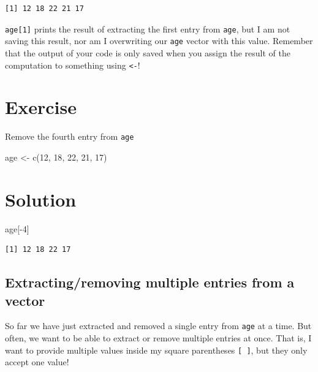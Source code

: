 \documentclass[
  letterpaper,
  DIV=11,
  numbers=noendperiod]{scrreprt}
\newenvironment{Shaded}{\begin{snugshade}}{\end{snugshade}}
\newcommand{\DecValTok}[1]{\textcolor[rgb]{0.68,0.00,0.00}{#1}}
\newcommand{\FunctionTok}[1]{\textcolor[rgb]{0.28,0.35,0.67}{#1}}
\newcommand{\NormalTok}[1]{\textcolor[rgb]{0.00,0.23,0.31}{#1}}
\newcommand{\OtherTok}[1]{\textcolor[rgb]{0.00,0.23,0.31}{#1}}
\newcommand{\SpecialCharTok}[1]{\textcolor[rgb]{0.37,0.37,0.37}{#1}}
\begin{document}
\begin{verbatim}
[1] 12 18 22 21 17
\end{verbatim}

\texttt{age{[}1{]}} prints the result of extracting the first entry from
\texttt{age}, but I am not saving this result, nor am I overwriting our
\texttt{age} vector with this value. Remember that the output of your
code is only saved when you assign the result of the computation to
something using \texttt{\textless{}-}!

\section{Exercise}

Remove the fourth entry from \texttt{age}

\begin{Shaded}
\begin{Highlighting}[]
\NormalTok{age }\OtherTok{\textless{}{-}} \FunctionTok{c}\NormalTok{(}\DecValTok{12}\NormalTok{, }\DecValTok{18}\NormalTok{, }\DecValTok{22}\NormalTok{, }\DecValTok{21}\NormalTok{, }\DecValTok{17}\NormalTok{)}
\end{Highlighting}
\end{Shaded}

\section{Solution}

\begin{Shaded}
\begin{Highlighting}[]
\NormalTok{age[}\SpecialCharTok{{-}}\DecValTok{4}\NormalTok{]}
\end{Highlighting}
\end{Shaded}

\begin{verbatim}
[1] 12 18 22 17
\end{verbatim}

\subsection{Extracting/removing multiple entries from a
vector}\label{extractingremoving-multiple-entries-from-a-vector}

So far we have just extracted and removed a single entry from
\texttt{age} at a time. But often, we want to be able to extract or
remove multiple entries at once. That is, I want to provide multiple
values inside my square parentheses \texttt{{[}\ {]}}, but they only
accept one value!
\end{document}

